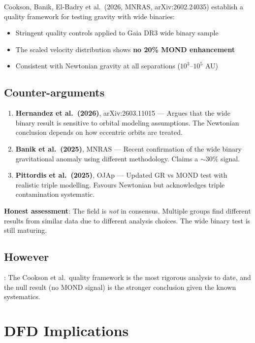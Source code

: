 \documentclass[11pt,a4paper]{article}
\begin{document}
Cookson, Banik, El-Badry et al.\ (2026, MNRAS, arXiv:2602.24035) establish a quality framework for testing gravity with wide binaries:
\begin{itemize}
\item Stringent quality controls applied to Gaia DR3 wide binary sample
\item The scaled velocity distribution shows \textbf{no 20\% MOND enhancement}
\item Consistent with Newtonian gravity at all separations ($10^3$--$10^5$ AU)
\end{itemize}

\subsection{Counter-arguments}

\begin{enumerate}
\item \textbf{Hernandez et al.\ (2026)}, arXiv:2603.11015 --- Argues that the wide binary result is sensitive to orbital modeling assumptions. The Newtonian conclusion depends on how eccentric orbits are treated.

\item \textbf{Banik et al.\ (2025)}, MNRAS --- Recent confirmation of the wide binary gravitational anomaly using different methodology. Claims a $\sim 30\%$ signal.

\item \textbf{Pittordis et al.\ (2025)}, OJAp --- Updated GR vs MOND test with realistic triple modelling. Favours Newtonian but acknowledges triple contamination systematic.
\end{enumerate}

\textbf{Honest assessment}: The field is \emph{not} in consensus. Multiple groups find different results from similar data due to different analysis choices. The wide binary test is still maturing.

\subsection{However}: The Cookson et al.\ quality framework is the most rigorous analysis to date, and the null result (no MOND signal) is the stronger conclusion given the known systematics.

\section{DFD Implications}
\end{document}
